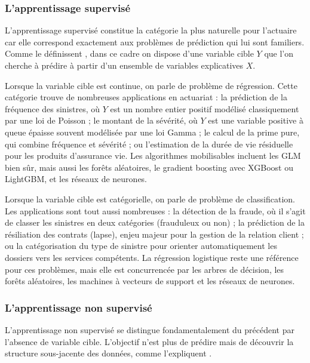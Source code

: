 \documentclass[
  french,
]{book}
\theoremstyle{definition}
\theoremstyle{definition}
\theoremstyle{definition}
\theoremstyle{definition}
\theoremstyle{remark}
\begin{document}
\subsubsection{L'apprentissage supervisé}

L'apprentissage supervisé constitue la catégorie la plus naturelle pour l'actuaire car elle correspond exactement aux problèmes de prédiction qui lui sont familiers. Comme le définissent \citet{hastie2009elements}, dans ce cadre on dispose d'une variable cible \(Y\) que l'on cherche à prédire à partir d'un ensemble de variables explicatives \(X\).

Lorsque la variable cible est continue, on parle de problème de régression. Cette catégorie trouve de nombreuses applications en actuariat : la prédiction de la fréquence des sinistres, où \(Y\) est un nombre entier positif modélisé classiquement par une loi de Poisson ; le montant de la sévérité, où \(Y\) est une variable positive à queue épaisse souvent modélisée par une loi Gamma ; le calcul de la prime pure, qui combine fréquence et sévérité ; ou l'estimation de la durée de vie résiduelle pour les produits d'assurance vie. Les algorithmes mobilisables incluent les GLM bien sûr, mais aussi les forêts aléatoires, le gradient boosting avec XGBoost ou LightGBM, et les réseaux de neurones.

Lorsque la variable cible est catégorielle, on parle de problème de classification. Les applications sont tout aussi nombreuses : la détection de la fraude, où il s'agit de classer les sinistres en deux catégories (frauduleux ou non) ; la prédiction de la résiliation des contrats (lapse), enjeu majeur pour la gestion de la relation client ; ou la catégorisation du type de sinistre pour orienter automatiquement les dossiers vers les services compétents. La régression logistique reste une référence pour ces problèmes, mais elle est concurrencée par les arbres de décision, les forêts aléatoires, les machines à vecteurs de support et les réseaux de neurones.

\subsubsection{L'apprentissage non supervisé}

L'apprentissage non supervisé se distingue fondamentalement du précédent par l'absence de variable cible. L'objectif n'est plus de prédire mais de découvrir la structure sous-jacente des données, comme l'expliquent \citet{hastie2009elements}.
\end{document}
